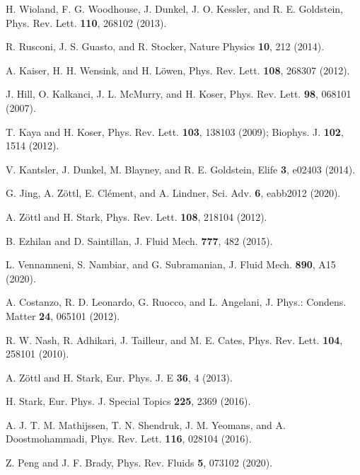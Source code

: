 \documentclass[aps,pre,preprint,superscriptaddress,amsmath,amssymb,nofootinbib]{revtex4}
\begin{document}
\begin{thebibliography}{100}
{H. Wioland, F. G. Woodhouse, J. Dunkel, J. O. Kessler, and R. E. Goldstein}, {Phys. Rev. Lett.} {\bf 110}, {268102} {(2013)}. 

{R. Rusconi, J. S. Guasto, and R. Stocker}, {Nature Physics} {\bf 10}, {212} {(2014)}.

{A. Kaiser, H. H. Wensink, and H. L\"owen}, {Phys. Rev. Lett.} {\bf 108}, {268307} {(2012)}. 

{J. Hill, O. Kalkanci, J. L. McMurry, and H. Koser}, {Phys. Rev. Lett.} {\bf 98}, {068101} {(2007)}. 

{T. Kaya and H. Koser}, {Phys. Rev. Lett.} {\bf 103}, {138103} {(2009)}; 
{Biophys. J.} {\bf 102}, {1514} {(2012)}.

{V. Kantsler, J. Dunkel, M. Blayney, and R. E. Goldstein}, {Elife} {\bf 3}, {e02403} {(2014)}.

{G. Jing, A. Z\"ottl, E. Cl\'ement, and A. Lindner}, {Sci. Adv.} {\bf 6}, {eabb2012} {(2020)}.

{A. Z\"ottl and H. Stark}, {Phys. Rev. Lett.} {\bf 108}, {218104} {(2012)}. 

{B. Ezhilan and D. Saintillan}, {J. Fluid Mech.} {\bf 777}, {482} {(2015)}. 

{L. Vennamneni, S. Nambiar, and G. Subramanian}, {J. Fluid Mech.} {\bf 890}, {A15} {(2020)}.

{A. Costanzo, R. D. Leonardo, G. Ruocco, and L. Angelani}, {J. Phys.: Condens. Matter} {\bf 24}, {065101} {(2012)}. 

 
{R. W. Nash, R. Adhikari, J. Tailleur, and  M. E. Cates}, {Phys. Rev. Lett.} {\bf 104}, {258101} {(2010)}. 

{A. Z\"ottl and H. Stark}, {Eur. Phys. J. E} {\bf 36}, {4} {(2013)}.

{H. Stark}, {Eur. Phys. J. Special Topics} {\bf 225}, {2369} {(2016)}. 

{A. J. T. M. Mathijssen, T. N. Shendruk, J. M. Yeomans, and A. Doostmohammadi}, {Phys. Rev. Lett.} {\bf 116}, {028104} {(2016)}. 

{Z. Peng and J. F. Brady}, {Phys. Rev. Fluids} {\bf 5}, {073102} {(2020)}. 


\end{thebibliography}
\end{document}
